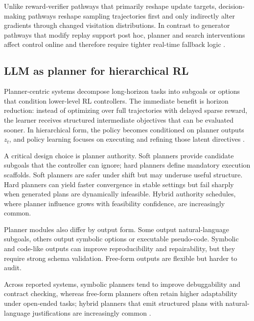 \documentclass[pdflatex,sn-mathphys-num]{sn-jnl}
\begin{document}
Unlike reward-verifier pathways that primarily reshape update targets, decision-making pathways reshape sampling trajectories first and only indirectly alter gradients through changed visitation distributions. In contrast to generator pathways that modify replay support post hoc, planner and search interventions affect control online and therefore require tighter real-time fallback logic \cite{arxiv_p_2310_12931,arxiv_p_2602_06493,arxiv_p_2310_20587,arxiv_p_2601_08107}.

\subsection{LLM as planner for hierarchical RL}
Planner-centric systems decompose long-horizon tasks into subgoals or options that condition lower-level RL controllers. The immediate benefit is horizon reduction: instead of optimizing over full trajectories with delayed sparse reward, the learner receives structured intermediate objectives that can be evaluated sooner. In hierarchical form, the policy becomes conditioned on planner outputs $z_t$, and policy learning focuses on executing and refining those latent directives \cite{arxiv_p_2204_01691,arxiv_p_2305_16291,arxiv_p_2405_01534,arxiv_p_2602_16165}.

A critical design choice is planner authority. Soft planners provide candidate subgoals that the controller can ignore; hard planners define mandatory execution scaffolds. Soft planners are safer under shift but may underuse useful structure. Hard planners can yield faster convergence in stable settings but fail sharply when generated plans are dynamically infeasible. Hybrid authority schedules, where planner influence grows with feasibility confidence, are increasingly common.

Planner modules also differ by output form. Some output natural-language subgoals, others output symbolic options or executable pseudo-code. Symbolic and code-like outputs can improve reproducibility and repairability, but they require strong schema validation. Free-form outputs are flexible but harder to audit.

Across reported systems, symbolic planners tend to improve debuggability and contract checking, whereas free-form planners often retain higher adaptability under open-ended tasks; hybrid planners that emit structured plans with natural-language justifications are increasingly common \cite{doi_p_10_1109_icra48891_2023_10160591,arxiv_p_2510_13229,arxiv_p_2510_14967,arxiv_p_2601_14140}.
\end{document}
